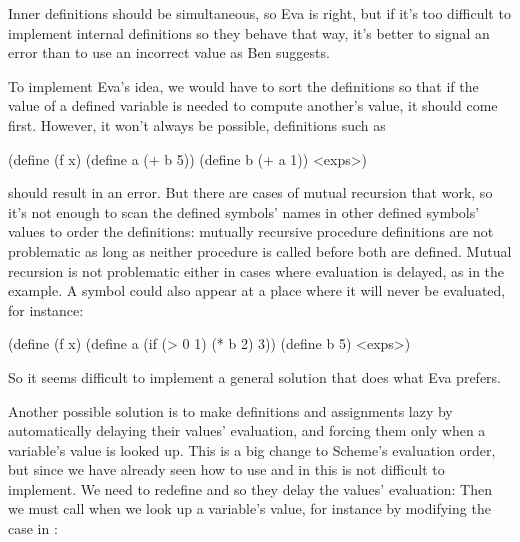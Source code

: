 \begin{exe}[4.19]
    Inner definitions should be simultaneous, so Eva is right, but if it’s too 
    difficult to implement internal definitions so they behave that way, it’s 
    better to signal an error than to use an incorrect value as Ben suggests.

    To implement Eva’s idea, we would have to sort the definitions so that if 
    the value of a defined variable is needed to compute another’s value, it 
    should come first. However, it won’t always be possible, definitions such as
    \begin{cscm}
	(define (f x)
	    (define a (+ b 5))
	    (define b (+ a 1))
	    <exps>)
    \end{cscm}
    should result in an error. But there are cases of mutual recursion that 
    work, so it’s not enough to scan the defined symbols’ names in other defined 
    symbols’ values to order the definitions: mutually recursive procedure 
    definitions are not problematic as long as neither procedure is called 
    before both are defined. Mutual recursion is not problematic either in cases 
    where evaluation is delayed, as in the  example. A symbol could 
    also appear at a place where it will never be evaluated, for instance:
    \begin{cscm}
	(define (f x)
	    (define a (if (> 0 1) (* b 2) 3))
	    (define b 5)
	    <exps>)
    \end{cscm}
    So it seems difficult to implement a general solution that does what Eva 
    prefers.

    \medskip

    Another possible solution is to make definitions and assignments lazy by 
    automatically delaying their values’ evaluation, and forcing them only when 
    a variable’s value is looked up. This is a big change to Scheme’s evaluation 
    order, but since we have already seen how to use  and 
     in  this is not difficult to implement. We need to 
    redefine  and  so they delay the 
    values’ evaluation:
    Then we must call  when we look up a variable’s value, for 
    instance by modifying the  case in :
\end{exe}

